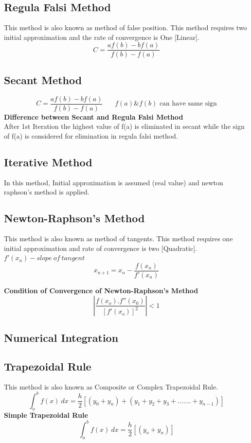 \subsection*{Regula Falsi Method}
This method is also known as method of false position. This method requires two initial approximation and the rate of convergence is One [Linear].
\[C= \frac{af(b)-bf(a)}{f(b)-f(a)}\]

\subsection*{Secant Method}
\[C = \frac{af(b)-bf(a)}{f(b)-f(a)}\ \ \ \ \ \ \ \ f(a) \& f(b) \text{ can have same sign}\]
\textbf{Difference between Secant and Regula Falsi Method}\\
After 1st Iteration the highest value of f(a) is eliminated in secant while the sign of f(a) is considered for elimination in regula falsi method.

\subsection*{Iterative Method}
In this method, Initial approximation is assumed (real value) and newton raphson's method is applied.

\subsection*{Newton-Raphson's Method}
This method is also known as method of tangents. This method requires one initial approximation and rate of convergence is two [Quadratic]. \(f'(x_n)-slope\ of\ tangent\)
\[x_{n+1}=x_n-\frac{f(x_n)}{f'(x_n)}\]

\textbf{Condition of Convergence of Newton-Raphson's Method}
\[\left|\frac{f(x_o).f''(x_0)}{[f'(x_o)]^2} \right| < 1\]

\subsection{Numerical Integration}
\subsection*{Trapezoidal Rule}
This method is also known as Composite or Complex Trapezoidal Rule.\\
\[\int_a^bf(x)\ dx=\frac{h}{2}[(y_0+y_n)+(y_1+y_2+y_3+\ldots\ldots.+y_{n-1})]\]
\textbf{Simple Trapezoidal Rule} \[\int_a^bf(x)\ dx=\frac{h}{2}[(y_o+y_n)]\]

